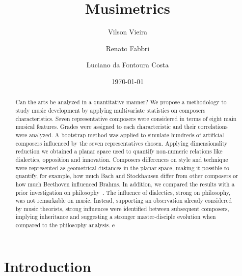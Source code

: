 \documentclass[
 aip,
 jmp,
 amsmath,amssymb,
 reprint,
]{revtex4-1}
\begin{document}

\title[Musimetrics]{Musimetrics}

\author{Vilson Vieira}

\author{Renato Fabbri}

\author{Luciano da Fontoura Costa}

\date{\today}

\begin{abstract}

Can the arts be analyzed in a quantitative manner? We propose a
methodology
to study music development by
applying multivariate statistics on composers characteristics.
Seven representative composers were considered in terms of
eight main musical features. 
Grades
were assigned to each characteristic and their correlations were
analyzed. 
A bootstrap method was
applied to simulate hundreds of artificial composers
influenced by the seven representatives chosen.
Applying dimensionality
reduction we obtained a planar space
used to quantify non-numeric relations like dialectics, opposition
and innovation.
Composers differences on style and technique were represented
as geometrical distances in the planar space, making it possible to
quantify, for example, how much Bach and Stockhausen differ from other composers or how
much Beethoven influenced Brahms.
In addition, we compared the results with a prior investigation
on
philosophy~\cite{Fabbri}. The influence of dialectics, strong on
philosophy, was not remarkable on music.
Instead, supporting an observation already considered by music
theorists, strong influences were identified between
subsequent composers, implying inheritance and suggesting a stronger
master-disciple evolution when compared to the philosophy analysis.
e  
\end{abstract}


\maketitle

\section{\label{sec:level1}Introduction}
\end{document}
